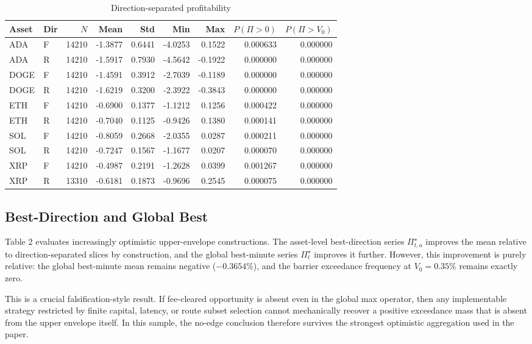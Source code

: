 \documentclass[11pt,a4paper]{article}
\begin{document}
\begin{table}[H]
\centering
\caption{Direction-separated profitability}
\begin{tabular}{l l r r r r r r r}
\toprule
Asset & Dir & $N$ & Mean & Std & Min & Max & $P(\Pi>0)$ & $P(\Pi>V_0)$ \\
\midrule
ADA & F & 14210 & -1.3877 & 0.6441 & -4.0253 & 0.1522 & 0.000633 & 0.000000 \\
ADA & R & 14210 & -1.5917 & 0.7930 & -4.5642 & -0.1922 & 0.000000 & 0.000000 \\
DOGE & F & 14210 & -1.4591 & 0.3912 & -2.7039 & -0.1189 & 0.000000 & 0.000000 \\
DOGE & R & 14210 & -1.6219 & 0.3200 & -2.3922 & -0.3843 & 0.000000 & 0.000000 \\
ETH & F & 14210 & -0.6900 & 0.1377 & -1.1212 & 0.1256 & 0.000422 & 0.000000 \\
ETH & R & 14210 & -0.7040 & 0.1125 & -0.9426 & 0.1380 & 0.000141 & 0.000000 \\
SOL & F & 14210 & -0.8059 & 0.2668 & -2.0355 & 0.0287 & 0.000211 & 0.000000 \\
SOL & R & 14210 & -0.7247 & 0.1567 & -1.1677 & 0.0207 & 0.000070 & 0.000000 \\
XRP & F & 14210 & -0.4987 & 0.2191 & -1.2628 & 0.0399 & 0.001267 & 0.000000 \\
XRP & R & 13310 & -0.6181 & 0.1873 & -0.9696 & 0.2545 & 0.000075 & 0.000000 \\
\bottomrule
\end{tabular}
\end{table}

\subsection{Best-Direction and Global Best}
\noindent Table 2 evaluates increasingly optimistic upper-envelope constructions. The asset-level best-direction series $\Pi^\star_{t,a}$ improves the mean relative to direction-separated slices by construction, and the global best-minute series $\Pi^\star_t$ improves it further. However, this improvement is purely relative: the global best-minute mean remains negative ($-0.3654\%$), and the barrier exceedance frequency at $V_0=0.35\%$ remains exactly zero.

\noindent This is a crucial falsification-style result. If fee-cleared opportunity is absent even in the global max operator, then any implementable strategy restricted by finite capital, latency, or route subset selection cannot mechanically recover a positive exceedance mass that is absent from the upper envelope itself. In this sample, the no-edge conclusion therefore survives the strongest optimistic aggregation used in the paper.
\end{document}
